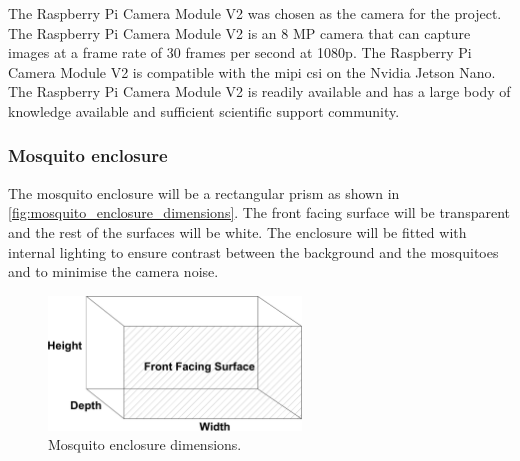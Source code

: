 The Raspberry Pi Camera Module V2 was chosen as the camera for the project. The Raspberry Pi Camera Module V2 is an 8 MP camera that can capture images at a frame rate of 30 frames per second at 1080p. The Raspberry Pi Camera Module V2 is compatible with the \gls{mipi} \gls{csi} on the Nvidia Jetson Nano. The Raspberry Pi Camera Module V2 is readily available and has a large body of knowledge available and sufficient scientific support community.



\subsubsection{Mosquito enclosure}
The mosquito enclosure will be a rectangular prism as shown in \autoref{fig:mosquito_enclosure_dimensions}. The front facing surface will be transparent and the rest of the surfaces will be white. The enclosure will be fitted with internal lighting to ensure contrast between the background and the mosquitoes and to minimise the camera noise.
\begin{figure}[!htb]
  \centering
  \includegraphics[width=0.6\textwidth]{figures/hardware_design/mos_enclosure.pdf}
  \caption{Mosquito enclosure dimensions.}
  \label{fig:mosquito_enclosure_dimensions}
\end{figure}



